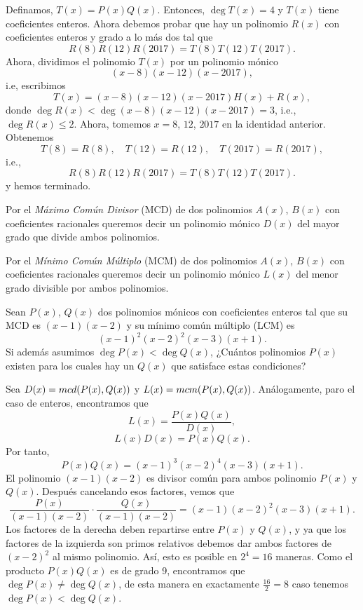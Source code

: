 \begin{solution}
    Definamos, $T(x)=P(x)Q(x)$.
    Entonces, $\deg T(x) = 4$ y $T(x)$ tiene coeficientes enteros.
    Ahora debemos probar que hay un polinomio $R(x)$ con coeficientes enteros y grado a lo más dos tal que
    \[
        R(8)R(12)R(2017)=T(8)T(12)T(2017).
    \]
    Ahora, dividimos el polinomio $T(x)$ por un polinomio mónico
    \[
        (x-8)(x-12)(x-2017),
    \]
    i.e, escribimos
    \[
        T(x)=(x-8)(x-12)(x-2017)H(x)+R(x),
    \]
    donde $\deg R(x) < \deg (x-8)(x-12)(x-2017)=3$, i.e., $\deg R(x) \leq 2$.
    Ahora, tomemos $x=8$, $12$, $2017$ en la identidad anterior. Obtenemos
    \[
        T(8)=R(8),\quad T(12)=R(12),\quad T(2017)=R(2017),
    \]
    i.e.,
    \[
        R(8)R(12)R(2017)=T(8)T(12)T(2017).
    \]
    y hemos terminado.
\end{solution}

Por el \textit{Máximo Común Divisor} (MCD) de dos polinomios $A(x)$, $B(x)$ con coeficientes racionales queremos decir un polinomio mónico $D(x)$ del mayor grado que divide ambos polinomios.

Por el \textit{Mínimo Común Múltiplo} (MCM) de dos polinomios $A(x)$, $B(x)$ con coeficientes racionales queremos decir un polinomio mónico $L(x)$ del menor grado divisible por ambos polinomios.

\begin{example}
    Sean $P(x)$, $Q(x)$ dos polinomios mónicos con coeficientes enteros tal que su MCD es $(x - 1)(x - 2)$ y su mínimo común múltiplo (LCM) es
    \[
        (x - 1)^2 (x - 2)^2 (x - 3)(x + 1).
    \]
    Si además asumimos $\deg P(x) < \deg Q(x)$, ¿Cuántos polinomios $P(x)$ existen para los cuales hay un $Q(x)$ que satisface estas condiciones?
\end{example}

\begin{solution}
    Sea $D(x) = mcd(P(x), Q(x))$ y $L(x) = mcm(P(x), Q(x))$.
    Análogamente, paro el caso de enteros, encontramos que
    \[
        L(x) = \frac{P(x) Q(x)}{D(x)},
    \]
    \ie
    \[
        L(x) D(x) = P(x) Q(x).
    \]
    Por tanto,
    \[
        P(x) Q(x) = (x - 1)^3 (x - 2)^4 (x - 3) (x + 1).
    \]
    El polinomio $(x - 1)(x - 2)$ es divisor común para ambos polinomio $P(x)$ y $Q(x)$.
    Después cancelando esos factores, vemos que
    \[
        \frac{P(x)}{(x - 1)(x - 2)} \cdot \frac{Q(x)}{(x - 1)(x - 2)} = (x - 1)(x - 2)^2 (x - 3)(x + 1).
    \]
    Los factores de la derecha deben repartirse entre $P(x)$ y $Q(x)$, y ya que los factores de la izquierda son primos relativos debemos dar ambos factores de $(x - 2)^2$ al mismo polinomio.
    Así, esto es posible en $2^4 = 16$ maneras.
    Como el producto $P(x) Q(x)$ es de grado 9, encontramos que $\deg{P(x)} \neq \deg{Q(x)}$, de esta manera en exactamente $\frac{16}{2} = 8$ caso tenemos $\deg{P(x)} < \deg{Q(x)}$.
\end{solution}


